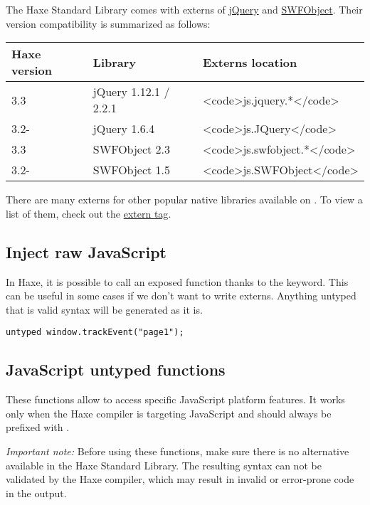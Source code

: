 The Haxe Standard Library comes with externs of \href{https://jquery.com/}{jQuery} and \href{http://blog.deconcept.com/swfobject/}{SWFObject}. Their version compatibility is summarized as follows:

\begin{center}
\begin{tabular}{| l | l | l |}
	\hline
	Haxe version & Library               & Externs location \\ \hline
	3.3          & jQuery 1.12.1 / 2.2.1 & <code>js.jquery.*</code> \\
	3.2-         & jQuery 1.6.4          & <code>js.JQuery</code> \\
	3.3          & SWFObject 2.3         & <code>js.swfobject.*</code> \\
	3.2-         & SWFObject 1.5         & <code>js.SWFObject</code> \\ \hline
\end{tabular}
\end{center}

There are many externs for other popular native libraries available on . To view a list of them, check out the \href{http://lib.haxe.org/t/extern/}{extern tag}.

\subsection{Inject raw JavaScript}
\label{target-javascript-injection}

In Haxe, it is possible to call an exposed function thanks to the  keyword. This can be useful in some cases if we don't want to write externs. Anything untyped that is valid syntax will be generated as it is.

\begin{lstlisting}
untyped window.trackEvent("page1");
\end{lstlisting}


\subsection{JavaScript untyped functions}
\label{target-javascript-untyped}

These functions allow to access specific JavaScript platform features. It works only when the Haxe compiler is targeting JavaScript and should always be prefixed with .

\emph{Important note:} Before using these functions, make sure there is no alternative available in the Haxe Standard Library. The resulting syntax can not be validated by the Haxe compiler, which may result in invalid or error-prone code in the output.


